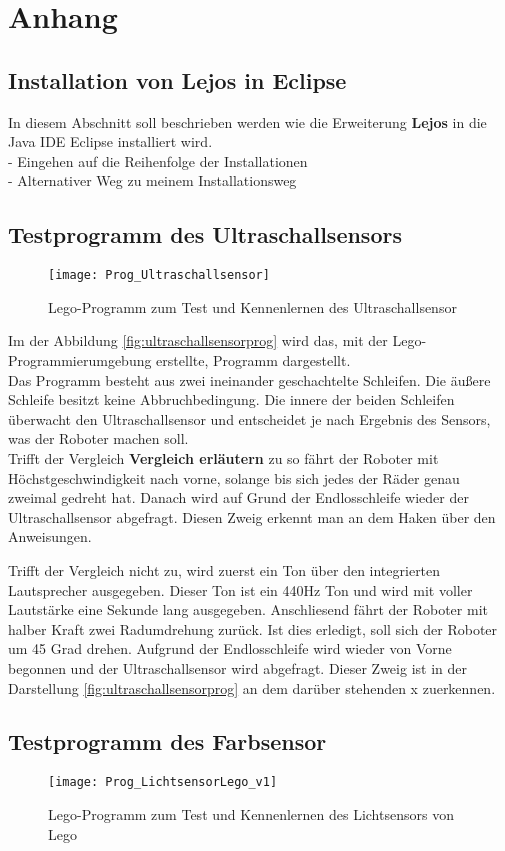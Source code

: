 \chapter{Anhang}
\section{Installation von Lejos in Eclipse}
In diesem Abschnitt soll beschrieben werden wie die Erweiterung \textbf{Lejos} in die Java IDE Eclipse installiert wird.\\ 
- Eingehen auf die Reihenfolge der Installationen\\
- Alternativer Weg zu meinem Installationsweg \\
\section{Testprogramm des Ultraschallsensors}
\begin{figure}[htb]
\centering
\texttt{[image: Prog\_Ultraschallsensor]}
\caption{Lego-Programm zum Test und Kennenlernen des Ultraschallsensor}
\label{fig:ultraschallsensorprog}
\end{figure}
Im der Abbildung \vref{fig:ultraschallsensorprog} wird das, mit der Lego-Programmierumgebung erstellte, Programm dargestellt.\\
Das Programm besteht aus zwei ineinander geschachtelte Schleifen. Die äußere Schleife besitzt keine Abbruchbedingung. Die innere der beiden Schleifen überwacht den Ultraschallsensor und entscheidet je nach Ergebnis des Sensors, was der Roboter machen soll.\\
Trifft der Vergleich \textbf{Vergleich erläutern} zu so fährt der Roboter mit Höchstgeschwindigkeit nach vorne, solange bis sich jedes der Räder genau zweimal gedreht hat. Danach wird auf Grund der Endlosschleife wieder der Ultraschallsensor abgefragt. Diesen Zweig erkennt man an dem Haken über den Anweisungen.

Trifft der Vergleich nicht zu, wird zuerst ein Ton über den integrierten Lautsprecher ausgegeben. Dieser Ton ist ein 440Hz Ton und wird mit voller Lautstärke eine Sekunde lang ausgegeben. Anschliesend fährt der Roboter mit halber Kraft zwei Radumdrehung zurück. Ist dies erledigt, soll sich der Roboter um 45 Grad drehen. Aufgrund der Endlosschleife wird wieder von Vorne begonnen und der Ultraschallsensor wird abgefragt. Dieser Zweig ist in der Darstellung \vref{fig:ultraschallsensorprog} an dem darüber stehenden x zuerkennen.

\section{Testprogramm des Farbsensor}
\begin{figure}[htb]
\centering
\texttt{[image: Prog\_LichtsensorLego\_v1]}
\caption{Lego-Programm zum Test und Kennenlernen des Lichtsensors von Lego}
\end{figure}


